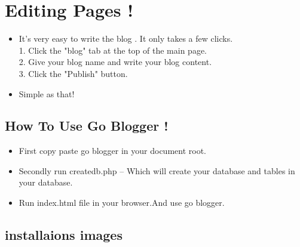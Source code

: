 \documentclass{article}
\begin{document}
\section{\bf Editing Pages !}
\begin{itemize}
\item It's very easy to write the blog . It only takes a few clicks.\\
1. Click the "blog"  tab at the top of the main page.\\
2. Give your blog name and write your blog content.\\
3. Click the "Publish" button.\\

\item Simple as that! 
\end{itemize}

\subsection{\bf How To Use Go Blogger !}
\begin{itemize}
\item First copy paste go blogger in your document root.
 \item Secondly run createdb.php -- Which will create your database and tables in your database.
\item  Run index.html file in your browser.And use go blogger.
\end{itemize}
\subsection{\bf installaions images}

\begin{figure}[h]
\end{figure}
\end{document}
